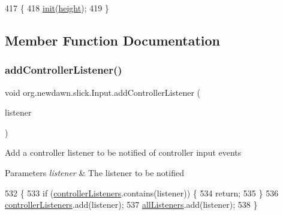 \begin{DoxyCode}
417                              \{
418         \mbox{\hyperlink{classorg_1_1newdawn_1_1slick_1_1_input_a793fc05d5ffdf793eac37e6577bace4c}{init}}(\mbox{\hyperlink{classorg_1_1newdawn_1_1slick_1_1_input_a7d805ec6ad6944a4c48189e8435c3589}{height}});
419     \}
\end{DoxyCode}


\subsection{Member Function Documentation}
\mbox{\label{classorg_1_1newdawn_1_1slick_1_1_input_a365351842cce1e87223149ad5089c4c1}} 
\subsubsection{\texorpdfstring{add\+Controller\+Listener()}{addControllerListener()}}
{\footnotesize\ttfamily void org.\+newdawn.\+slick.\+Input.\+add\+Controller\+Listener (\begin{DoxyParamCaption}\item[{\mbox{\hyperlink{interfaceorg_1_1newdawn_1_1slick_1_1_controller_listener}{Controller\+Listener}}}]{listener }\end{DoxyParamCaption})\hspace{0.3cm}{\ttfamily [inline]}}

Add a controller listener to be notified of controller input events


\begin{DoxyParams}{Parameters}
{\em listener} & The listener to be notified \\
\hline
\end{DoxyParams}

\begin{DoxyCode}
532                                                                    \{
533         \textcolor{keywordflow}{if} (\mbox{\hyperlink{classorg_1_1newdawn_1_1slick_1_1_input_a762495b937bf0e42b5dbfaa29bdb1b98}{controllerListeners}}.contains(listener)) \{
534             \textcolor{keywordflow}{return};
535         \}
536         \mbox{\hyperlink{classorg_1_1newdawn_1_1slick_1_1_input_a762495b937bf0e42b5dbfaa29bdb1b98}{controllerListeners}}.add(listener);
537         \mbox{\hyperlink{classorg_1_1newdawn_1_1slick_1_1_input_a26d5ed77d8b0444118d630336d0ab6d7}{allListeners}}.add(listener);
538     \}
\end{DoxyCode}
\mbox{\label{classorg_1_1newdawn_1_1slick_1_1_input_af5ad91bb375e8834e1914f441794561b}} 
